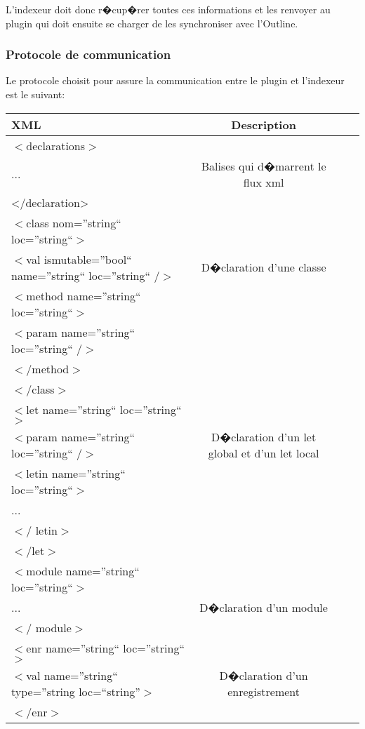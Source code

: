 \documentclass[a4paper,11pt,titlepage]{article}
\begin{document}
L'indexeur doit donc r�cup�rer toutes ces informations et les renvoyer au plugin qui doit ensuite se charger de les synchroniser avec l'Outline.


\subsubsection{Protocole de communication}

Le protocole choisit pour assure la communication entre le plugin et l'indexeur est le suivant:

\begin{center}
\begin{tabular}{|l|c|c|c|}
 \hline
 XML & Description \\
 \hline
 $<$declarations$>$ & \\... & Balises qui d�marrent le flux xml\\</declaration>  & \\
 \hline
 $<$class nom=''string`` loc=''string``$>$ & \\
 $<$val ismutable=''bool`` name=''string`` loc=''string`` $/>$ & D�claration d'une classe\\
 $<$method name=''string`` loc=''string``$>$ & \\
 $<$param name=''string`` loc=''string`` $/>$ & \\
 $</$method$>$ & \\
 $</$class$>$ & \\
 \hline
 $<$let name=''string`` loc=''string``$>$ & \\
 $<$param name=''string`` loc=''string`` $/>$ & D�claration d'un let global et d'un let local\\
 $<$letin name=''string`` loc=''string``$>$ & \\... & \\$</$ letin$>$ &\\
 $</$let$>$ &\\
 \hline
 $<$module name=''string`` loc=''string``$>$ &\\... & D�claration d'un module\\$</$ module$>$ &\\
 \hline
 $<$enr name=''string`` loc=''string``$>$ & \\
 $<$val name=''string`` type=''string loc=``string''$>$ & D�claration d'un enregistrement\\
 $</$enr$>$ & \\
 \hline
\end{tabular}
\end{center}
\end{document}
